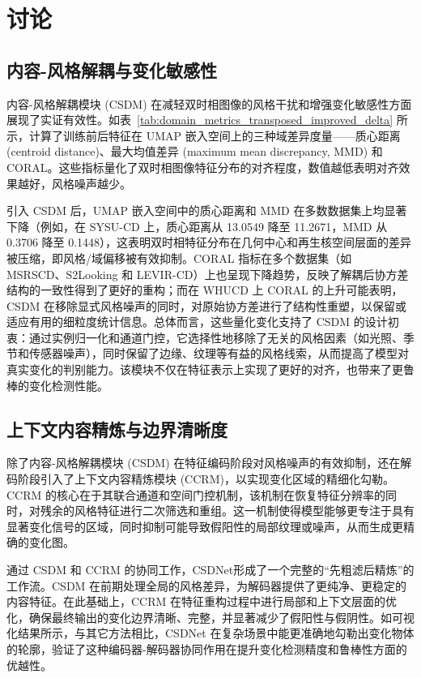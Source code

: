 \section{讨论}

\subsection{内容-风格解耦与变化敏感性}
内容-风格解耦模块 (CSDM) 在减轻双时相图像的风格干扰和增强变化敏感性方面展现了实证有效性。如表~\ref{tab:domain_metrics_transposed_improved_delta} 所示，计算了训练前后特征在 UMAP 嵌入空间上的三种域差异度量——质心距离 (centroid distance)、最大均值差异 (maximum mean discrepancy, MMD) 和 CORAL。这些指标量化了双时相图像特征分布的对齐程度，数值越低表明对齐效果越好，风格噪声越少。

引入 CSDM 后，UMAP 嵌入空间中的质心距离和 MMD 在多数数据集上均显著下降（例如，在 SYSU-CD 上，质心距离从 13.0549 降至 11.2671，MMD 从 0.3706 降至 0.1448），这表明双时相特征分布在几何中心和再生核空间层面的差异被压缩，即风格/域偏移被有效抑制。CORAL 指标在多个数据集（如 MSRSCD、S2Looking 和 LEVIR-CD）上也呈现下降趋势，反映了解耦后协方差结构的一致性得到了更好的重构；而在 WHUCD 上 CORAL 的上升可能表明，CSDM 在移除显式风格噪声的同时，对原始协方差进行了结构性重塑，以保留或适应有用的细粒度统计信息。总体而言，这些量化变化支持了 CSDM 的设计初衷：通过实例归一化和通道门控，它选择性地移除了无关的风格因素（如光照、季节和传感器噪声），同时保留了边缘、纹理等有益的风格线索，从而提高了模型对真实变化的判别能力。该模块不仅在特征表示上实现了更好的对齐，也带来了更鲁棒的变化检测性能。

\subsection{上下文内容精炼与边界清晰度}
除了内容-风格解耦模块 (CSDM) 在特征编码阶段对风格噪声的有效抑制，还在解码阶段引入了上下文内容精炼模块 (CCRM)，以实现变化区域的精细化勾勒。CCRM 的核心在于其联合通道和空间门控机制，该机制在恢复特征分辨率的同时，对残余的风格特征进行二次筛选和重组。这一机制使得模型能够更专注于具有显著变化信号的区域，同时抑制可能导致假阳性的局部纹理或噪声，从而生成更精确的变化图。

通过 CSDM 和 CCRM 的协同工作，CSDNet形成了一个完整的“先粗滤后精炼”的工作流。CSDM 在前期处理全局的风格差异，为解码器提供了更纯净、更稳定的内容特征。在此基础上，CCRM 在特征重构过程中进行局部和上下文层面的优化，确保最终输出的变化边界清晰、完整，并显著减少了假阳性与假阴性。如可视化结果所示，与其它方法相比，CSDNet 在复杂场景中能更准确地勾勒出变化物体的轮廓，验证了这种编码器-解码器协同作用在提升变化检测精度和鲁棒性方面的优越性。


